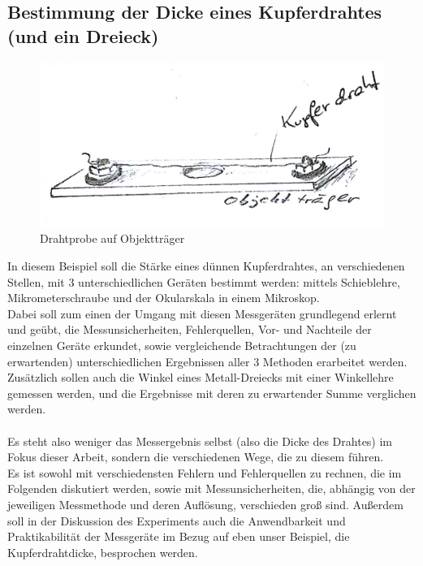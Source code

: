 \documentclass[12pt,a4paper]{article}
\begin{document}
\begin{multicols}{2}
\subsection{Bestimmung der Dicke eines Kupferdrahtes (und ein Dreieck)}
\begin{figure}[H]
	\centering
  	\includegraphics[scale=0.3]{./figure/draht.png}
	\caption{Drahtprobe auf Objektträger}
	\label{fig:101}
\end{figure}
In diesem Beispiel soll die Stärke eines dünnen Kupferdrahtes, an verschiedenen Stellen, mit 3 unterschiedlichen Geräten bestimmt werden: mittels Schieblehre, Mikrometerschraube und der Okularskala in einem Mikroskop.\\
Dabei soll zum einen der Umgang mit diesen Messgeräten grundlegend erlernt und geübt, die Messunsicherheiten, Fehlerquellen, Vor- und Nachteile der einzelnen Geräte erkundet, sowie vergleichende Betrachtungen der (zu erwartenden) unterschiedlichen Ergebnissen aller 3 Methoden erarbeitet werden.\\
Zusätzlich sollen auch die Winkel eines Metall-Dreiecks mit einer Winkellehre gemessen werden, und die Ergebnisse mit deren zu erwartender Summe verglichen werden.\\
\\
Es steht also weniger das Messergebnis selbst (also die Dicke des Drahtes) im Fokus dieser Arbeit, sondern die verschiedenen Wege, die zu diesem führen.\\
Es ist sowohl mit verschiedensten Fehlern und Fehlerquellen zu rechnen, die im Folgenden diskutiert werden, sowie mit Messunsicherheiten, die, abhängig von der jeweiligen Messmethode und deren Auflösung, verschieden groß sind. Außerdem soll in der Diskussion des Experiments auch die Anwendbarkeit und Praktikabilität der Messgeräte im Bezug auf eben unser Beispiel, die Kupferdrahtdicke, besprochen werden.\\
\\


\end{multicols}
\end{document}
